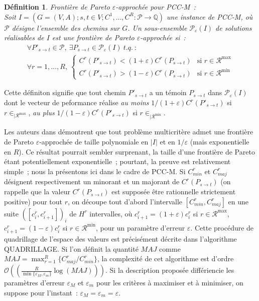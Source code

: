 \documentclass[10pt,francais]{llncs}
\newtheorem{defs}{D\'efinition}
\begin{document}
{\begin{defs}\label{def-epsilonpareto}
Fronti\`ere de Pareto $\varepsilon$-approch\'ee pour \textsc{PCC-M}~:\\
Soit $I=\left(G=(V,A) ; s,t\in V ; C^1,\ldots,C^R: \mathcal{P}\rightarrow\mathbb{Q}\right)$ une instance de \textsc{PCC-M}, o\`u $\mathcal{P}$ d\'esigne l'ensemble des chemins sur $G$. Un sous-ensemble $\mathscr{P}_{\varepsilon}(I)$ de solutions r\'ealisables de $I$ est une fronti\`ere de Pareto $\varepsilon$-approch\'ee si~:
$$\begin{array}{l}
\forall P'_{s \to t}\in\mathcal{P},\ \exists P_{s \to t}\in  \mathscr{P}_{\varepsilon}(I)\ t.q.~:\\[7pt]
\forall r=1,\ldots,R,\ 
\left\{\begin{array}{ll}
		C^r(P'_{s \to t}) < (1+\varepsilon) C^r(P_{s \to t})	&\textrm{si }r\in \mathscr{R}^{\max}\\[7pt]C^r(P'_{s \to t}) > (1-\varepsilon) C^r(P_{s \to t})	&\textrm{si }r\in \mathscr{R}^{\min}\end{array}\right.
\end{array}$$
\end{defs}

Cette d\'efiniton signifie que tout chemin  $P'_{s \to t}$ a un t\'emoin $P_{s \to t}$ dans $\mathscr{P}_{\varepsilon}(I)$ dont le vecteur de peformance r\'ealise {\em au moins} $1/(1+\varepsilon)C^r(P'_{s \to t})$ si $r\in _{|\mathscr{R}^{\max}}$, {\em au plus} $1/(1-\varepsilon)C^r(P'_{s \to t})$ si $r\in _{|\mathscr{R}^{\min}}$.







Les auteurs dans \cite{Papadimitriou2000} d\'emontrent que tout probl\`eme multicrit\`ere admet une fronti\`ere de Pareto $\varepsilon$-approch\'ee de taille polynomiale en $|I|$ et en $1/\varepsilon$ (mais exponentielle en $R$). Ce r\'esultat pourrait sembler surprenant, la taille d'une fronti\`ere de Pareto \'etant potentiellement exponentielle~; pourtant, la preuve est relativement simple~; nous la pr\'esentons ici dans le cadre de \textsc{PCC-M}. Si $C^r_{min}$ et $C^r_{maj}$ d\'esignent respectivement un minorant et un majorant de $C^r(P_{s \to t})$ (on rappelle que la valeur $C^r(P_{s \to t})$ est suppos\'ee \^{e}tre rationnelle strictement positive) pour tout $r$, on d\'ecoupe tout d'abord l'intervalle $[C^r_{min},C^r_{maj}]$ en une suite $\left([c^r_i,c^r_{i+1}]\right)_i$ de $H^r$ intervalles, o\`u $c^r_{i+1} = (1+\varepsilon)c^r_{i}$ si $r\in \mathscr{R}^{\max}$, $c^r_{i+1} = (1-\varepsilon)c^r_{i}$ si $r\in \mathscr{R}^{\min}$, pour un param\`etre d'erreur $\varepsilon$. Cette proc\'edure de quadrillage de l'espace des valeurs est pr\'ecis\'ement d\'ecrite dans l'algorithme QUADRILLAGE. Si l'on d\'efinit la quantit\'e $MAJ$ comme $MAJ=\max_{r=1}^R\{C^r_{maj}/C^r_{min}\}$, la complexit\'e de cet algorithme est d'ordre $\mathcal{O}\left(\left(\frac{R}{\min\{\varepsilon_M,\varepsilon_m\}}\log(MAJ)\right)\right)$. Si la description propos\'ee diff\'eriencie les param\`etres d'erreur $\varepsilon_M$ et $\varepsilon_m$ pour les crit\`eres \`a maximiser et \`a minimiser, on suppose pour l'instant~: $\varepsilon_M=\varepsilon_m=\varepsilon$.

}
\end{document}
